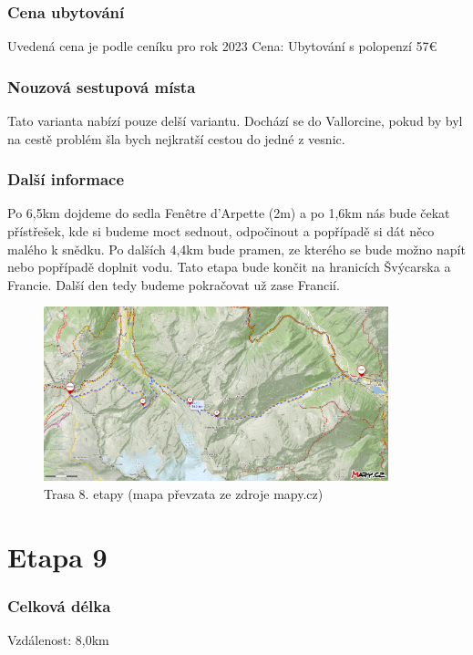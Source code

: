 \subsubsection*{Cena ubytování}
\noindent Uvedená cena je podle ceníku pro rok 2023
\noindent Cena: Ubytování s polopenzí 57\:€
\subsubsection*{Nouzová sestupová místa}
Tato varianta nabízí pouze delší variantu. Dochází se do Vallorcine, pokud by byl na cestě problém šla bych nejkratší cestou do jedné z vesnic.
\subsubsection*{Další informace}
Po 6,5\:km dojdeme do sedla Fenêtre d'Arpette (2\:m) a po 1,6\:km nás bude čekat přístřešek, kde si budeme moct sednout, odpočinout a popřípadě si dát něco malého k snědku. Po dalších 4,4\:km bude pramen, ze kterého se bude možno napít nebo popřípadě doplnit vodu. Tato etapa bude končit na hranicích Švýcarska a Francie. Další den tedy budeme pokračovat už zase Francií.
\begin{figure}[!hbt]
    \centering
    \includegraphics[width=10.0cm]{Figures/day_8.png}
    \caption[Trasa: den osmý]{Trasa 8. etapy (mapa převzata ze zdroje mapy.cz)}
    \label{Obr:day_8}
\end{figure} 
\section{Etapa 9}
\subsubsection*{Celková délka}
\noindent Vzdálenost: 8,0\:km

